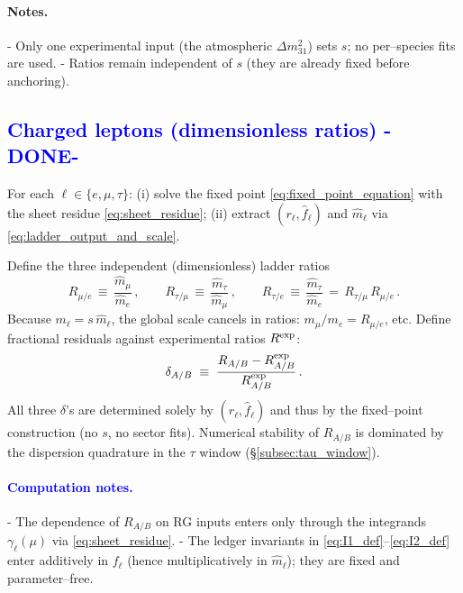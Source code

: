 \documentclass[%
 amsmath,amssymb,
 aps,
prb,
floatfix, showkeys
]{revtex4-2}
\newcommand{\modif}[1]{\textcolor{blue}{#1}}
\begin{document}
\paragraph{Notes.}
- Only one experimental input (the atmospheric $\Delta m^2_{31}$) sets $s$; no per--species fits are used.
- Ratios remain independent of $s$ (they are already fixed before anchoring).














{\modif{
\subsection{Charged leptons (dimensionless ratios)  -DONE-}
\label{subsec:leptons_ratios}
}}
For each $\ell\in\{e,\mu,\tau\}$:
(i) solve the fixed point \eqref{eq:fixed_point_equation} with the sheet residue \eqref{eq:sheet_residue};
(ii) extract $(r_\ell,\widehat f_\ell)$ and $\widehat m_\ell$ via \eqref{eq:ladder_output_and_scale}.

Define the three independent (dimensionless) ladder ratios
\begin{equation}
  R_{\mu/e} \,\equiv\, \frac{\widehat m_\mu}{\widehat m_e}\,,\qquad
  R_{\tau/\mu} \,\equiv\, \frac{\widehat m_\tau}{\widehat m_\mu}\,,\qquad
  R_{\tau/e} \,\equiv\, \frac{\widehat m_\tau}{\widehat m_e}
  \,=\, R_{\tau/\mu}\,R_{\mu/e}\,.
  \label{eq:lepton_ratios}
\end{equation}
Because $m_\ell = s\,\widehat m_\ell$, the global scale cancels in ratios: $m_\mu/m_e = R_{\mu/e}$, etc.
Define fractional residuals against experimental ratios $R^{\rm exp}$:
\begin{equation}
  \delta_{A/B} \;\equiv\; \frac{R_{A/B} - R^{\rm exp}_{A/B}}{R^{\rm exp}_{A/B}}\,.
  \label{eq:ratio_residuals}
\end{equation}
All three $\delta$'s are determined solely by $(r_\ell,\widehat f_\ell)$ and thus by the fixed--point construction (no $s$, no sector fits). Numerical stability of $R_{A/B}$ is dominated by the dispersion quadrature in the $\tau$ window (\S\ref{subsec:tau_window}).

\paragraph{\modif{ Computation notes.} }
- The dependence of $R_{A/B}$ on RG inputs enters only through the integrands $\gamma_\ell(\mu)$ via \eqref{eq:sheet_residue}.
- The ledger invariants in \eqref{eq:I1_def}–\eqref{eq:I2_def} enter additively in $f_\ell$ (hence multiplicatively in $\widehat m_\ell$); they are fixed and parameter--free.
\end{document}
